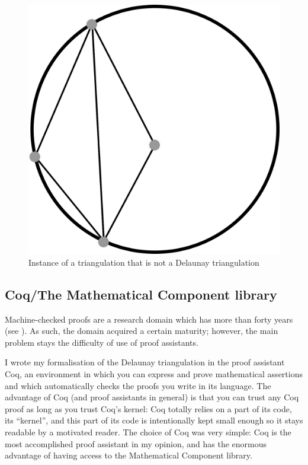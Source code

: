 \documentclass[a4paper,10pt]{article}
\begin{document}
\begin{figure}
\centering
\includegraphics[scale=1]{dessin2}
\caption{\label{notDelaunay} Instance of a triangulation that is not a Delaunay triangulation}

\end{figure}


\subsection{Coq/The Mathematical Component library}

Machine-checked proofs are a research domain which has more than forty years (see \cite{Automath}). As such, the domain acquired a certain maturity; however, the main problem stays the difficulty of use of proof assistants.

I wrote my formalisation of the Delaunay triangulation in the proof assistant {\sc Coq}, an environment in which you can express and prove mathematical assertions and which automatically checks the proofs you write in its language. The advantage of {\sc Coq} (and proof assistants in general) is that you can trust any {\sc Coq} proof as long as you trust {\sc Coq}'s kernel: {\sc Coq} totally relies on a part of its code, its ``kernel'', and this part of its code is intentionally kept small enough so it stays readable by a motivated reader. The choice of {\sc Coq} was very simple: {\sc Coq} is the most accomplished proof assistant in my opinion, and has the enormous advantage of having access to the {\sc Mathematical Component} library.
\end{document}

